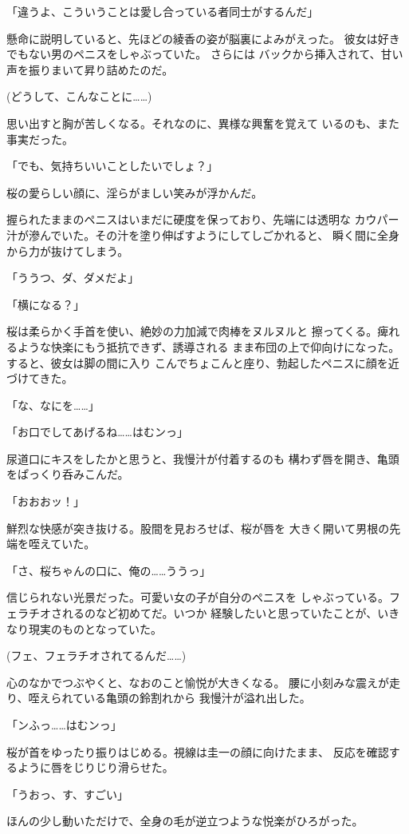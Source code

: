 ﻿\documentclass[
    book,tate,
    line_length=30zw,
    jafontsize=12pt,
    paper=b5j,
    landscape,
    ]{jlreq}
\begin{document}
「違うよ、こういうことは愛し合っている者同士がするんだ」

懸命に説明していると、先ほどの綾香の姿が脳裏によみがえった。
彼女は好きでもない男のペニスをしゃぶっていた。 さらには
バックから挿入されて、甘い声を振りまいて昇り詰めたのだ。

(どうして、こんなことに……)

思い出すと胸が苦しくなる。それなのに、異様な興奮を覚えて
いるのも、また事実だった。

「でも、気持ちいいことしたいでしょ？」

桜の愛らしい顔に、淫らがましい笑みが浮かんだ。

握られたままのペニスはいまだに硬度を保っており、先端には透明な
カウパー汁が滲んでいた。その汁を塗り伸ばすようにしてしごかれると、
瞬く間に全身から力が抜けてしまう。

「ううつ、ダ、ダメだよ」

「横になる？」

桜は柔らかく手首を使い、絶妙の力加減で肉棒をヌルヌルと
擦ってくる。痺れるような快楽にもう抵抗できず、誘導される
まま布団の上で仰向けになった。すると、彼女は脚の間に入り
こんでちょこんと座り、勃起したペニスに顔を近づけてきた。

「な、なにを……」

「お口でしてあげるね……はむンっ」

尿道口にキスをしたかと思うと、我慢汁が付着するのも
構わず唇を開き、亀頭をぱっくり呑みこんだ。

「おおおッ！」

鮮烈な快感が突き抜ける。股間を見おろせば、桜が唇を
大きく開いて男根の先端を咥えていた。

「さ、桜ちゃんの口に、俺の……ううっ」

信じられない光景だった。可愛い女の子が自分のペニスを
しゃぶっている。フェラチオされるのなど初めてだ。いつか
経験したいと思っていたことが、いきなり現実のものとなっていた。

(フェ、フェラチオされてるんだ……)

心のなかでつぶやくと、なおのこと愉悦が大きくなる。
腰に小刻みな震えが走り、咥えられている亀頭の鈴割れから
我慢汁が溢れ出した。

「ンふっ……はむンっ」

桜が首をゆったり振りはじめる。視線は圭一の顔に向けたまま、
反応を確認するように唇をじりじり滑らせた。

「うおっ、す、すごい」

ほんの少し動いただけで、全身の毛が逆立つような悦楽がひろがった。
\end{document}
